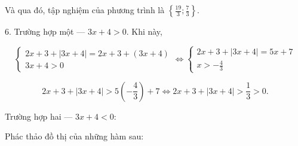 Và qua đó, tập nghiệm của phương trình là $\left\{\frac{19}{3}; \frac{7}{3}\right\}$.

6. \textcolor{colorEmphasisCyan}{Trường hợp một --- $3x + 4 > 0$}. Khi này, 

\begin{equation*}
   \begin{cases}
      2x + 3 + |3x + 4| = 2x + 3 + (3x + 4) \\
      3x + 4 > 0
   \end{cases} \iff \begin{cases}
      2x + 3 + |3x + 4| = 5x + 7 \\
      x > -\frac{4}{3}
   \end{cases}
\end{equation*}

\begin{equation*}
   2x + 3 + |3x + 4| > 5 \left(-\frac{4}{3}\right) + 7 \iff 2x + 3 + |3x + 4| > \frac{1}{3} > 0.
\end{equation*}

\textcolor{colorEmphasis}{Trường hợp hai --- $3x + 4 < 0$}:



\exercise Phác thảo đồ thị của những hàm sau:

